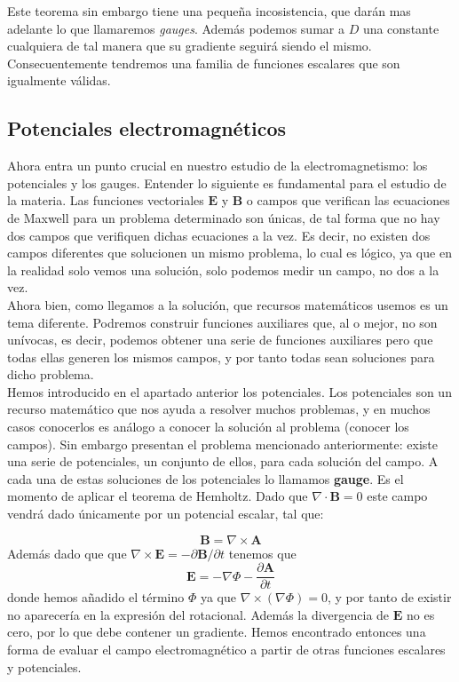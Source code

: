\documentclass[12pt,a4paper]{article}
\newcommand{\parciales}[2]{\frac{\partial #1}{\partial #2}}
\newcommand{\rota}{\nabla \times}
\newcommand{\dive}{\nabla \cdot}
\newcommand{\Bn}{\mathbf{B}}
\newcommand{\En}{\mathbf{E}}
\newcommand{\An}{\mathbf{A}}
\numberwithin{equation}{section}
\numberwithin{figure}{section}
\begin{document}
Este teorema sin embargo tiene una pequeña incosistencia, que darán mas adelante lo que llamaremos \textit{gauges}. Además podemos sumar a $D$ una constante cualquiera de tal manera que su gradiente seguirá siendo el mismo. Consecuentemente tendremos una familia de funciones escalares que son igualmente válidas. 


\subsection{Potenciales electromagnéticos}

Ahora entra un punto crucial en nuestro estudio de la electromagnetismo: los potenciales y los gauges. Entender lo siguiente es fundamental para el estudio de la materia. Las funciones vectoriales $\En$ y $\Bn$ o campos que verifican las ecuaciones de Maxwell para un problema determinado son únicas, de tal forma que no hay dos campos que verifiquen dichas ecuaciones a la vez. Es decir, no existen dos campos diferentes que solucionen un mismo problema, lo cual es lógico, ya que en la realidad solo vemos una solución, solo podemos medir un campo, no dos a la vez. \\

Ahora bien, como llegamos a la solución, que recursos matemáticos usemos es un tema diferente. Podremos construir funciones auxiliares que, al o mejor, no son unívocas, es decir, podemos obtener una serie de funciones auxiliares pero que todas ellas generen los mismos campos, y por tanto todas sean soluciones para dicho problema. \\

Hemos introducido en el apartado anterior los potenciales. Los potenciales son un recurso matemático que nos ayuda a resolver muchos problemas, y en muchos casos conocerlos es análogo a conocer la solución al problema (conocer los campos). Sin embargo presentan el problema mencionado anteriormente: existe una serie de potenciales, un conjunto de ellos, para cada solución del campo. A cada una de estas soluciones de los potenciales lo llamamos \textbf{gauge}. Es el momento de aplicar el teorema de Hemholtz. Dado que $\dive \Bn = 0$ este campo vendrá dado únicamente por un potencial escalar, tal que:

\begin{equation}
\Bn = \rota  \An
\end{equation}
Además dado que que $\rota \En =- \partial \Bn / \partial t$ tenemos que
\begin{equation}
\En = - \nabla \Phi - \parciales{\An}{t}
\end{equation}
donde hemos añadido el término $\Phi$ ya que $\rota (\nabla \Phi)= 0$, y por tanto de existir no aparecería en la expresión del rotacional. Además la divergencia de $\En$ no es cero, por lo que debe contener un gradiente. Hemos encontrado entonces una forma de evaluar el campo electromagnético a partir de otras funciones escalares y potenciales. \\
\end{document}
